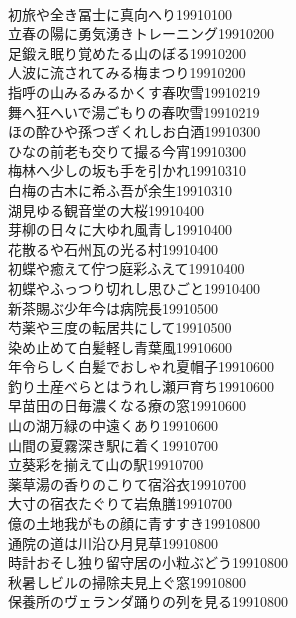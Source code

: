\begin{multicols}{2}
\\初旅や全き冨士に真向へり\hfill{19910100}
\\立春の陽に勇気湧きトレーニング\hfill{19910200}
\\足鍛え眠り覚めたる山のぼる\hfill{19910200}
\\人波に流されてみる梅まつり\hfill{19910200}
\\指呼の山みるみるかくす春吹雪\hfill{19910219}
\\舞へ狂へいで湯ごもりの春吹雪\hfill{19910219}
\\ほの酔ひや孫つぎくれしお白酒\hfill{19910300}
\\ひなの前老も交りて撮る今宵\hfill{19910300}
\\梅林へ少しの坂も手を引かれ\hfill{19910310}
\\白梅の古木に希ふ吾が余生\hfill{19910310}
\\湖見ゆる観音堂の大桜\hfill{19910400}
\\芽柳の日々に大ゆれ風青し\hfill{19910400}
\\花散るや石州瓦の光る村\hfill{19910400}
\\初蝶や癒えて佇つ庭彩ふえて\hfill{19910400}
\\初蝶やふっつり切れし思ひごと\hfill{19910400}
\\新茶賜ぶ少年今は病院長\hfill{19910500}
\\芍薬や三度の転居共にして\hfill{19910500}
\\染め止めて白髪軽し青葉風\hfill{19910600}
\\年令らしく白髪でおしゃれ夏帽子\hfill{19910600}
\\釣り土産べらとはうれし瀬戸育ち\hfill{19910600}
\\早苗田の日毎濃くなる療の窓\hfill{19910600}
\\山の湖万緑の中遠くあり\hfill{19910600}
\\山間の夏霧深き駅に着く\hfill{19910700}
\\立葵彩を揃えて山の駅\hfill{19910700}
\\薬草湯の香りのこりて宿浴衣\hfill{19910700}
\\大寸の宿衣たぐりて岩魚膳\hfill{19910700}
\\億の土地我がもの顔に青すすき\hfill{19910800}
\\通院の道は川沿ひ月見草\hfill{19910800}
\\時計おそし独り留守居の小粒ぶどう\hfill{19910800}
\\秋暑しビルの掃除夫見上ぐ窓\hfill{19910800}
\\保養所のヴェランダ踊りの列を見る\hfill{19910800}

\end{multicols}
